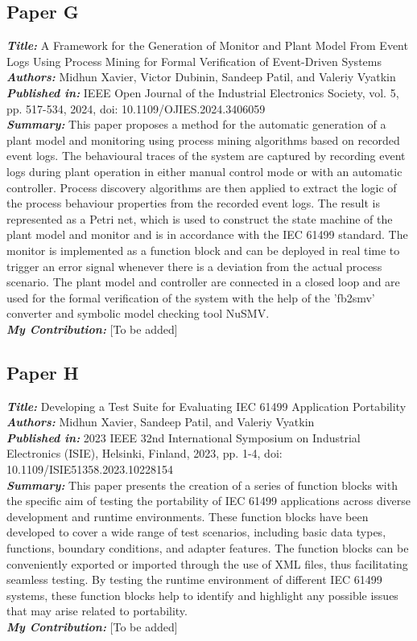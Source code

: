 \subsection{Paper G}
\textbf{\textit{Title:}} A Framework for the Generation of Monitor and Plant Model From Event Logs Using Process Mining for Formal Verification of Event-Driven Systems\\
\textbf{\textit{Authors:}} Midhun Xavier, Victor Dubinin, Sandeep Patil, and Valeriy Vyatkin\\
\textbf{\textit{Published in:}} IEEE Open Journal of the Industrial Electronics Society, vol. 5, pp. 517-534, 2024, doi: 10.1109/OJIES.2024.3406059\\
\textbf{\textit{Summary:}} This paper proposes a method for the automatic generation of a plant model and monitoring using process mining algorithms based on recorded event logs. The behavioural traces of the system are captured by recording event logs during plant operation in either manual control mode or with an automatic controller. Process discovery algorithms are then applied to extract the logic of the process behaviour properties from the recorded event logs. The result is represented as a Petri net, which is used to construct the state machine of the plant model and monitor and is in accordance with the IEC 61499 standard. The monitor is implemented as a function block and can be deployed in real time to trigger an error signal whenever there is a deviation from the actual process scenario. The plant model and controller are connected in a closed loop and are used for the formal verification of the system with the help of the 'fb2smv' converter and symbolic model checking tool NuSMV.\\
\textbf{\textit{My Contribution:}} [To be added]

\subsection{Paper H}
\textbf{\textit{Title:}} Developing a Test Suite for Evaluating IEC 61499 Application Portability\\
\textbf{\textit{Authors:}} Midhun Xavier, Sandeep Patil, and Valeriy Vyatkin\\
\textbf{\textit{Published in:}} 2023 IEEE 32nd International Symposium on Industrial Electronics (ISIE), Helsinki, Finland, 2023, pp. 1-4, doi: 10.1109/ISIE51358.2023.10228154\\
\textbf{\textit{Summary:}} This paper presents the creation of a series of function blocks with the specific aim of testing the portability of IEC 61499 applications across diverse development and runtime environments. These function blocks have been developed to cover a wide range of test scenarios, including basic data types, functions, boundary conditions, and adapter features. The function blocks can be conveniently exported or imported through the use of XML files, thus facilitating seamless testing. By testing the runtime environment of different IEC 61499 systems, these function blocks help to identify and highlight any possible issues that may arise related to portability.\\
\textbf{\textit{My Contribution:}} [To be added]


